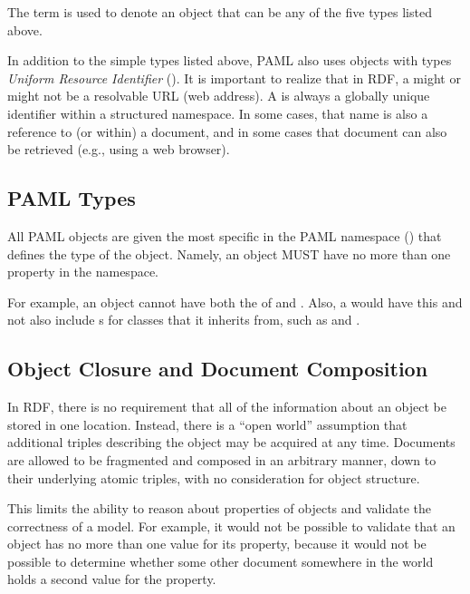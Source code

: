 The term  is used to denote an object that can be any of the five types listed above.

In addition to the simple types listed above, PAML also uses objects with types \emph{Uniform Resource Identifier} (). It is important to realize that in RDF, a  might or might not be a resolvable URL (web address).  A  is always a globally unique identifier within a structured namespace.  In some cases, that name is also a reference to (or within) a document, and in some cases that document can also be retrieved (e.g., using a web browser).


\subsection{PAML Types}
\label{sec:pamlTypes}

All PAML objects are given the most specific  in the PAML namespace () that defines the type of the object.  Namely, an object MUST have no more than one  property in the  namespace.

For example, an object cannot have both the  of  and .  Also, a  would have this  and not also include s for classes that it inherits from, such as  and .


\subsection{Object Closure and Document Composition}

In RDF, there is no requirement that all of the information about an object be stored in one location.  
Instead, there is a ``open world'' assumption that additional triples describing the object may be acquired at any time.
Documents are allowed to be fragmented and composed in an arbitrary manner, down to their underlying atomic triples, with no consideration for object structure.

This limits the ability to reason about properties of objects and validate the correctness of a model.
For example, it would not be possible to validate that an  object has no more than one value for its  property, because it would not be possible to determine whether some other document somewhere in the world holds a second value for the property.

